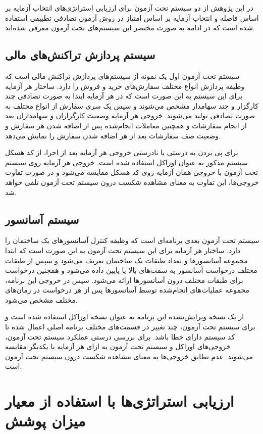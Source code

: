 در این پژوهش از دو سیستم تحت آزمون برای ارزیابی استراتژی‌های انتخاب آزمایه بر اساس فاصله و انتخاب آزمایه بر اساس امتیاز در روش آزمون تصادفی تطبیقی استفاده شده است که در ادامه به صورت مختصر این سیستم‌های تحت آزمون معرفی شده‌اند.

\subsection{سیستم پردازش تراکنش‌های مالی}

سیستم تحت آزمون اول یک نمونه از سیستم‌های پردازش تراکنش مالی است که وظیفه پردازش انواع مختلف سفارش‌های خرید و فروش را دارد. ساختار هر آزمایه برای این سیستم به این صورت است که در هر آزمایه ابتدا به صورت تصادفی چند کارگزار و چند سهامدار مشخص می‌شوند و سپس یک سری سفارش از انواع مختلف به صورت تصادفی تولید می‌شوند. خروجی هر آزمایه وضعیت کارگزاران و سهامداران بعد از انجام سفارشات و همچنین معاملات انجام‌شده پس از اضافه شدن هر سفارش و وضعیت صف سفارشات بعد از هر اضافه شدن سفارش را نمایش می‌دهد. 

برای پی بردن به درستی یا نادرستی خروجی هر آزمایه بعد از اجرا، از کد هسکل سیستم مذکور به عنوان اوراکل استفاده شده است. خروجی هر آزمایه روی سیستم تحت آزمون با خروجی همان آزمایه روی کد هسکل مقایسه می‌شود و در صورت تفاوت خروجی‌ها، این تفاوت به معنای مشاهده شکست درون سیستم تحت آزمون تلقی خواهد شد.

\subsection{سیستم آسانسور}

سیستم تحت آزمون بعدی برنامه‌ای است که وظیفه کنترل آسانسورهای یک ساختمان را دارد. ساختار هر آزمایه برای این سیستم تحت آزمون به این صورت است که ابتدا مجموعه آسانسورها و تعداد طبقات یک ساختمان تعریف می‌شود و سپس از طبقات مختلف درخواست آسانسور به سمت‌های بالا یا پایین داده می‌شود و همچنین درخواست برای طبقات مختلف درون آسانسورها ارائه می‌شود. سپس در خروجی این برنامه، مجموعه عملیات‌های انجام‌شده توسط آسانسورها پس از هر درخواست در زمان‌های مختلف مشخص می‌شود.

از یک نسخه ویرایش‌نشده این برنامه به عنوان نسخه اوراکل استفاده شده است و برای سیستم تحت آزمون، چند تغییر در قسمت‌های مختلف برنامه اصلی اعمال شده تا کد سیستم دارای خطا باشد. برای بررسی درستی عملکرد سیستم تحت آزمون، خروجی‌های اوراکل و سیستم تحت آزمون به ازای هر آزمایه با یکدیگر مقایسه می‌شوند. عدم تطابق خروجی‌ها به معنای مشاهده شکست درون سیستم تحت آزمون است.

\section{ارزیابی استراتژی‌ها با استفاده از معیار میزان پوشش}

